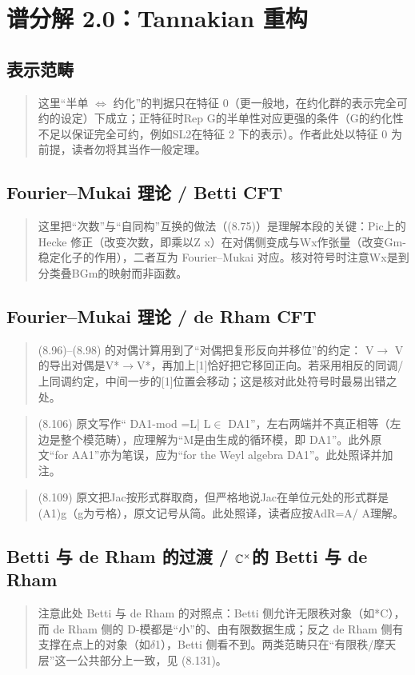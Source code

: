 \section{谱分解 2.0：Tannakian 重构}
\subsection*{表示范畴}
\begin{quote}\small
这里“半单 $\Leftrightarrow$ 约化”的判据只在特征 0（更一般地，在约化群的表示完全可约的设定）下成立；正特征时Rep G的半单性对应更强的条件（G的约化性不足以保证完全可约，例如SL2在特征 2 下的表示）。作者此处以特征 0 为前提，读者勿将其当作一般定理。
\end{quote}

\subsection*{Fourier--Mukai 理论 / Betti CFT}
\begin{quote}\small
这里把“次数”与“自同构”互换的做法（(8.75)）是理解本段的关键：Pic上的 Hecke 修正（改变次数，即乘以Z x）在对偶侧变成与Wx作张量（改变Gm-稳定化子的作用），二者互为 Fourier--Mukai 对应。核对符号时注意Wx是到分类叠BGm的映射而非函数。
\end{quote}

\subsection*{Fourier--Mukai 理论 / de Rham CFT}
\begin{quote}\small
(8.96)–(8.98) 的对偶计算用到了“对偶把复形反向并移位”的约定： V$\to$ V的导出对偶是V*$\to$V*，再加上[1]恰好把它移回正向。若采用相反的同调/上同调约定，中间一步的[1]位置会移动；这是核对此处符号时最易出错之处。
\end{quote}

\begin{quote}\small
(8.106) 原文写作“ DA1-mod =L| L$\in$ DA1”，左右两端并不真正相等（左边是整个模范畴），应理解为“M是由生成的循环模，即 DA1”。此外原文“for AA1”亦为笔误，应为“for the Weyl algebra DA1”。此处照译并加注。
\end{quote}

\begin{quote}\small
(8.109) 原文把Jac按形式群取商，但严格地说Jac在单位元处的形式群是(A1)g（g为亏格），原文记号从简。此处照译，读者应按AdR=A/ A理解。
\end{quote}

\subsection*{Betti 与 de Rham 的过渡 / $\mathbb{C}^{\times}$的 Betti 与 de Rham}
\begin{quote}\small
注意此处 Betti 与 de Rham 的对照点：Betti 侧允许无限秩对象（如*C），而 de Rham 侧的 D-模都是“小”的、由有限数据生成；反之 de Rham 侧有支撑在点上的对象（如$\delta$1），Betti 侧看不到。两类范畴只在“有限秩/摩天层”这一公共部分上一致，见 (8.131)。
\end{quote}

